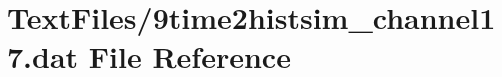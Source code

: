 \hypertarget{9time2histsim__channel17_8dat}{}\section{Text\+Files/9time2histsim\+\_\+channel17.dat File Reference}
\label{9time2histsim__channel17_8dat}
